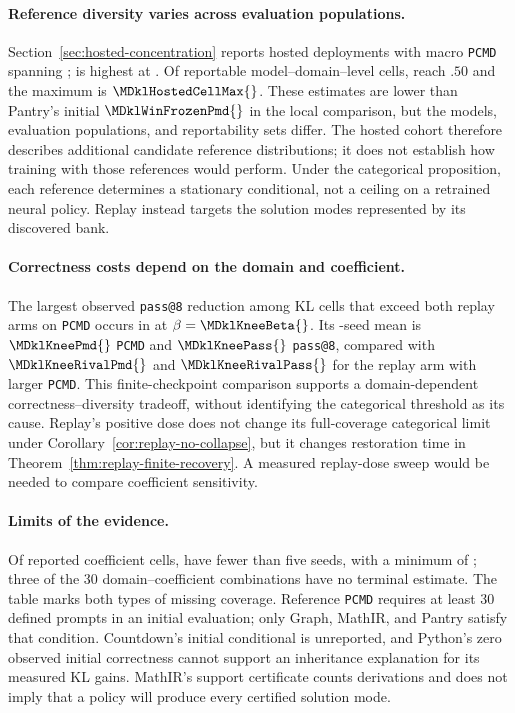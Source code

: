 \documentclass{article}
\newcommand{\1}{\mathbf 1}
\newcommand{\pmd}{\texttt{PCMD}}
\theoremstyle{remark}
\theoremstyle{definition}
\theoremstyle{plain}
\begin{document}
\paragraph{Reference diversity varies across evaluation populations.}
Section~\ref{sec:hosted-concentration} reports \MDklHostedModels{}
hosted deployments with macro \pmd{} spanning \MDklHostedRange{};
\MDklHostedHiModel{} is highest at \MDklHostedHi{}. Of
\MDklHostedCells{} reportable model--domain--level cells,
\MDklHostedCellsHalf{} reach $.50$ and the maximum is
$\MDklHostedCellMax{}$. These estimates are lower than Pantry's initial
$\MDklWinFrozenPmd{}$ in the local comparison, but the models,
evaluation populations, and reportability sets differ. The hosted cohort
therefore describes additional candidate reference distributions; it does
not establish how training with those references would perform. Under the
categorical proposition, each reference determines a stationary
conditional, not a ceiling on a retrained neural policy. Replay instead
targets the solution modes represented by its discovered bank.

\paragraph{Correctness costs depend on the domain and coefficient.}
The largest observed \texttt{pass@8} reduction among KL cells that exceed
both replay arms on \pmd{} occurs in \MDklKneeDomain{} at
$\beta=\MDklKneeBeta{}$. Its \MDklKneeSeeds{}-seed mean is
$\MDklKneePmd{}$ \pmd{} and $\MDklKneePass{}$ \texttt{pass@8},
compared with $\MDklKneeRivalPmd{}$ and $\MDklKneeRivalPass{}$ for
the replay arm with larger \pmd{}. This finite-checkpoint comparison
supports a domain-dependent correctness--diversity tradeoff, without
identifying the categorical threshold as its cause.
Replay's positive dose does not change its full-coverage categorical
limit under Corollary~\ref{cor:replay-no-collapse}, but it changes
restoration time in Theorem~\ref{thm:replay-finite-recovery}. A measured
replay-dose sweep would be needed to compare coefficient sensitivity.

\paragraph{Limits of the evidence.}
Of \MDklTotalCells{} reported coefficient cells, \MDklThinCells{} have
fewer than five seeds, with a minimum of \MDklSeedsMin{}; three of the
30 domain--coefficient combinations have no terminal estimate. The table
marks both types of missing coverage. Reference \pmd{} requires at least
30 defined prompts in an initial evaluation; only Graph, MathIR, and
Pantry satisfy that condition. Countdown's initial conditional is
unreported, and Python's zero observed initial correctness cannot support
an inheritance explanation for its measured KL gains. MathIR's support
certificate counts derivations and does not imply that a policy will
produce every certified solution mode.
\end{document}
